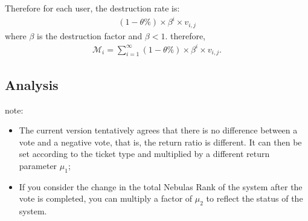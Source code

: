 Therefore for each user, the destruction rate is:
\begin{align}
(1-\theta\%) \times \beta^i \times v_{i,j}
\end{align}
\noindent where $\beta$ is the destruction factor and $\beta < 1$. therefore,
\begin{align}
    \mathcal{M}_i = \sum_{i=1}^{\infty} (1-\theta\%) \times \beta^i \times v_{i,j} .
\end{align}

\subsection{Analysis}

note:
\begin{itemize}
\item The current version tentatively agrees that there is no difference between a vote and a negative vote, that is, the return ratio is different. It can then be set according to the ticket type and multiplied by a different return parameter $\mu_1$;
\item If you consider the change in the total Nebulas Rank of the system after the vote is completed, you can multiply a factor of $\mu_2$ to reflect the status of the system.
\end{itemize}


